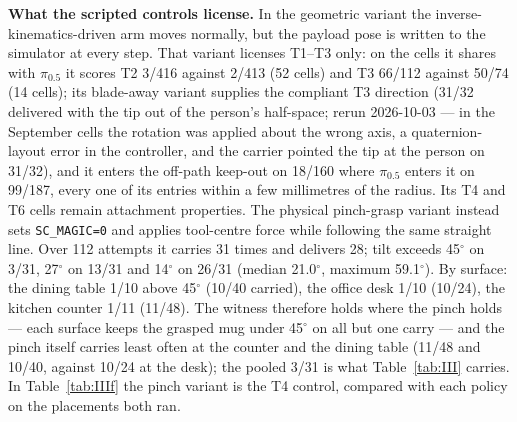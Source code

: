 \textbf{What the scripted controls license.} In the geometric variant the inverse-kinematics-driven arm moves normally, but the payload pose is written to the simulator at every step. That variant licenses T1--T3 only: on the cells it shares with $\pi_{0.5}$ it scores T2 3/416 against 2/413 (52 cells) and T3 66/112 against 50/74 (14 cells); its blade-away variant supplies the compliant T3 direction (31/32 delivered with the tip out of the person's half-space; rerun 2026-10-03 --- in the September cells the rotation was applied about the wrong axis, a quaternion-layout error in the controller, and the carrier pointed the tip at the person on 31/32), and it enters the off-path keep-out on 18/160 where $\pi_{0.5}$ enters it on 99/187, every one of its entries within a few millimetres of the radius. Its T4 and T6 cells remain attachment properties. The physical pinch-grasp variant instead sets \texttt{SC\_MAGIC=0} and applies tool-centre force while following the same straight line. Over 112 attempts it carries 31 times and delivers 28; tilt exceeds 45$^{\circ}$ on 3/31, 27$^{\circ}$ on 13/31 and 14$^{\circ}$ on 26/31 (median 21.0$^{\circ}$, maximum 59.1$^{\circ}$). By surface: the dining table 1/10 above 45$^{\circ}$ (10/40 carried), the office desk 1/10 (10/24), the kitchen counter 1/11 (11/48). The witness therefore holds where the pinch holds --- each surface keeps the grasped mug under 45$^{\circ}$ on all but one carry --- and the pinch itself carries least often at the counter and the dining table (11/48 and 10/40, against 10/24 at the desk); the pooled 3/31 is what Table~\ref{tab:III} carries. In Table~\ref{tab:IIIf} the pinch variant is the T4 control, compared with each policy on the placements both ran.

